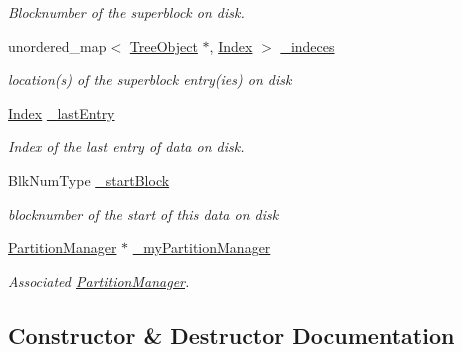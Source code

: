 \begin{DoxyCompactItemize}
\begin{DoxyCompactList}\small\item\em Blocknumber of the superblock on disk. \end{DoxyCompactList}\item 
\mbox{\label{classTreeObject_ae79eb5bd12c820b50f5d10c3f9b5dc66}} 
unordered\+\_\+map$<$ \mbox{\hyperlink{classTreeObject}{Tree\+Object}} $\ast$, \mbox{\hyperlink{structindex}{Index}} $>$ \mbox{\hyperlink{classTreeObject_ae79eb5bd12c820b50f5d10c3f9b5dc66}{\+\_\+indeces}}
\begin{DoxyCompactList}\small\item\em location(s) of the superblock entry(ies) on disk \end{DoxyCompactList}\item 
\mbox{\label{classTreeObject_a1418b7078e9fbb06506a310ad9417c52}} 
\mbox{\hyperlink{structindex}{Index}} \mbox{\hyperlink{classTreeObject_a1418b7078e9fbb06506a310ad9417c52}{\+\_\+last\+Entry}}
\begin{DoxyCompactList}\small\item\em Index of the last entry of data on disk. \end{DoxyCompactList}\item 
\mbox{\label{classTreeObject_a5872ffdaa0c1a0cbf393da9a8a7657f3}} 
Blk\+Num\+Type \mbox{\hyperlink{classTreeObject_a5872ffdaa0c1a0cbf393da9a8a7657f3}{\+\_\+start\+Block}}
\begin{DoxyCompactList}\small\item\em blocknumber of the start of this data on disk \end{DoxyCompactList}\item 
\mbox{\label{classTreeObject_a0b2ab130a5b95945bbd81250f667d63b}} 
\mbox{\hyperlink{classPartitionManager}{Partition\+Manager}} $\ast$ \mbox{\hyperlink{classTreeObject_a0b2ab130a5b95945bbd81250f667d63b}{\+\_\+my\+Partition\+Manager}}
\begin{DoxyCompactList}\small\item\em Associated \mbox{\hyperlink{classPartitionManager}{Partition\+Manager}}. \end{DoxyCompactList}\end{DoxyCompactItemize}


\subsection{Constructor \& Destructor Documentation}
\mbox{\label{classTreeObject_a1ef90156e6b45ddef28c59a89cd1097d}} 
